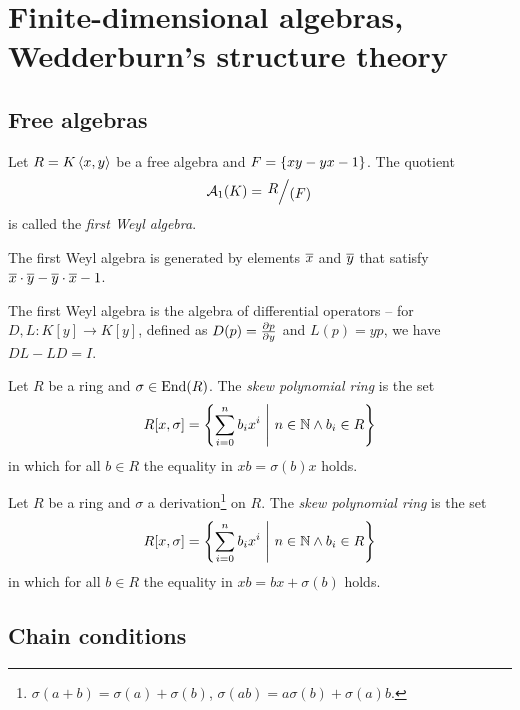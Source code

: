 \section{Finite-dimensional algebras, Wedderburn's structure theory}

\subsection{Free algebras}


\begin{definicija}
Let $R = K \left\langle x, y\right\rangle$ be a free algebra and
$F = \left\{xy - yx - 1\right\}$. The quotient
\[
\mathcal{A}_1(K) = \kvoc{R}{(F)}
\]
is called the \emph{first Weyl algebra}.
\end{definicija}

\begin{opomba}
The first Weyl algebra is generated by elements $\overline{x}$ and
$\overline{y}$ that satisfy
$\overline{x} \cdot \overline{y} - \overline{y} \cdot \overline{x} - 1$.
\end{opomba}

\begin{opomba}
The first Weyl algebra is the algebra of differential operators --
for $D, L \colon K[y] \to K[y]$, defined as $D(p) = \frac{\partial p}{\partial y}$
and $L(p) = yp$, we have $DL - LD = I$.
\end{opomba}

\begin{definicija}
Let $R$ be a ring and $\sigma \in \operatorname{End}(R)$. The
\emph{skew polynomial ring} is the set
\[
R[x, \sigma] =
\left\{\sum_{i=0}^n b_i x^i~\middle\vert~n \in \mathbb{N} \land b_i \in R\right\}
\]
in which for all $b \in R$ the equality in $x b = \sigma(b) x$
holds.
\end{definicija}

\begin{definicija}
Let $R$ be a ring and $\sigma$ a
derivation\footnote{$\sigma(a+b) = \sigma(a) + \sigma(b)$,
$\sigma(ab) = a\sigma(b) + \sigma(a)b$.} on $R$. The
\emph{skew polynomial ring} is the set
\[
R[x, \sigma] =
\left\{\sum_{i=0}^n b_i x^i~\middle\vert~n \in \mathbb{N} \land b_i \in R\right\}
\]
in which for all $b \in R$ the equality in $x b = b x + \sigma(b)$
holds.
\end{definicija}

\newpage

\subsection{Chain conditions}

